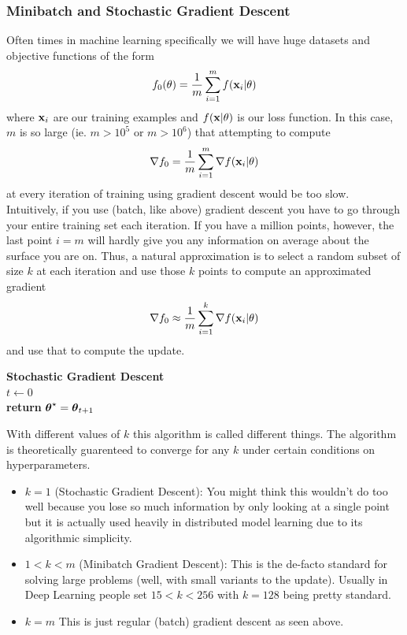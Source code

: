 \documentclass{article}
\begin{document}
\subsubsection{Minibatch and Stochastic Gradient Descent}

Often times in machine learning specifically we will have huge datasets
and objective functions of the form
\[
    f_0(\theta) = \frac{1}{m}\sum_{i=1}^m f({\bf x}_i | \theta)
\]
where ${\bf x}_i$ are our training examples and $f({\bf x}|\theta)$ is our loss function.
In this case, $m$ is so large (ie. $m > 10^5$ or $m > 10^6$) that attempting to compute
\[
    \nabla f_0 = \frac{1}{m}\sum_{i=1}^m \nabla f({\bf x}_i | \theta)
\]
at every iteration of training using gradient descent would be too slow. Intuitively,
if you use (batch, like above) gradient descent you have to go through your
entire training set each iteration. If you have a million points, however,
the last point $i=m$ will hardly give you any information on average about the surface
you are on. Thus, a natural approximation is to select a random subset of size
$k$ at each iteration and use those $k$ points to compute an approximated gradient
\[
    \nabla f_0 \approx \frac{1}{m}\sum_{i=1}^k \nabla f({\bf x}_i | \theta)
\]
and use that to compute the update. 

\IncMargin{1em}
\begin{algorithm}
    \textbf{Stochastic Gradient Descent}\\
    $t \leftarrow 0$\\
    \textbf{return } $\hbox{\boldmath$\theta$}^\star = \hbox{\boldmath$\theta$}_{t+1}$
\end{algorithm}

With different values of $k$ this algorithm is called different things. The algorithm
is theoretically guarenteed to converge for any $k$ under certain conditions on hyperparameters.
\begin{itemize}
    \item $k=1$ (Stochastic Gradient Descent): You might think this wouldn't
        do too well because you lose so much information by only looking at a
        single point but it is actually used heavily in distributed model learning
        due to its algorithmic simplicity.
    \item $1 < k < m$ (Minibatch Gradient Descent): This is the de-facto standard
        for solving large problems (well, with small variants to the update). Usually in Deep
        Learning people set $15 < k < 256$ with $k=128$ being pretty standard.
    \item $k=m$ This is just regular (batch) gradient descent as seen above.
\end{itemize}
\end{document}
